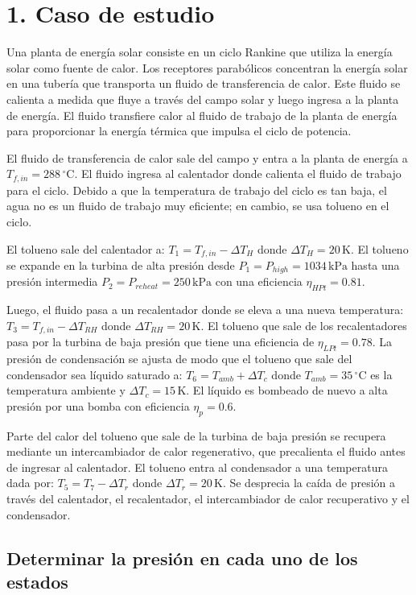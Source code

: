 \documentclass[conference]{IEEEtran}
\theoremstyle{mytheoremstyle}
\theoremstyle{mytheoremstyle}
\theoremstyle{myproblemstyle}
\begin{document}
\section*{1. Caso de estudio}
Una planta de energía solar consiste en un ciclo Rankine que utiliza la energía solar como fuente de calor. Los receptores parabólicos concentran la energía solar en una tubería que transporta un fluido de transferencia de calor. Este fluido se calienta a medida que fluye a través del campo solar y luego ingresa a la planta de energía. El fluido transfiere calor al fluido de trabajo de la planta de energía para proporcionar la energía térmica que impulsa el ciclo de potencia.

El fluido de transferencia de calor sale del campo y entra a la planta de energía a $T_{f,in} = 288 \,^{\circ}\text{C}$. El fluido ingresa al calentador donde calienta el fluido de trabajo para el ciclo. Debido a que la temperatura de trabajo del ciclo es tan baja, el agua no es un fluido de trabajo muy eficiente; en cambio, se usa tolueno en el ciclo.

El tolueno sale del calentador a:
$T_1 = T_{f,in} - \Delta T_H$
donde $\Delta T_H = 20 \, \text{K}$. El tolueno se expande en la turbina de alta presión desde $P_1 = P_{high} = 1034 \, \text{kPa}$ hasta una presión intermedia $P_2 = P_{reheat} = 250 \, \text{kPa}$ con una eficiencia $\eta_{HPt} = 0.81$.

Luego, el fluido pasa a un recalentador donde se eleva a una nueva temperatura:
$T_3 = T_{f,in} - \Delta T_{RH}$
donde $\Delta T_{RH} = 20 \, \text{K}$. El tolueno que sale de los recalentadores pasa por la turbina de baja presión que tiene una eficiencia de $\eta_{LPt} = 0.78$. La presión de condensación se ajusta de modo que el tolueno que sale del condensador sea líquido saturado a:
$T_6 = T_{amb} + \Delta T_c$
donde $T_{amb} = 35 \,^{\circ}\text{C}$ es la temperatura ambiente y $\Delta T_c = 15 \, \text{K}$. El líquido es bombeado de nuevo a alta presión por una bomba con eficiencia $\eta_p = 0.6$.

Parte del calor del tolueno que sale de la turbina de baja presión se recupera mediante un intercambiador de calor regenerativo, que precalienta el fluido antes de ingresar al calentador. El tolueno entra al condensador a una temperatura dada por:
$T_5 = T_7 - \Delta T_r$
donde $\Delta T_r = 20 \, \text{K}$. Se desprecia la caída de presión a través del calentador, el recalentador, el intercambiador de calor recuperativo y el condensador.

\subsection*{Determinar la presión en cada uno de los estados} 
\end{document}

